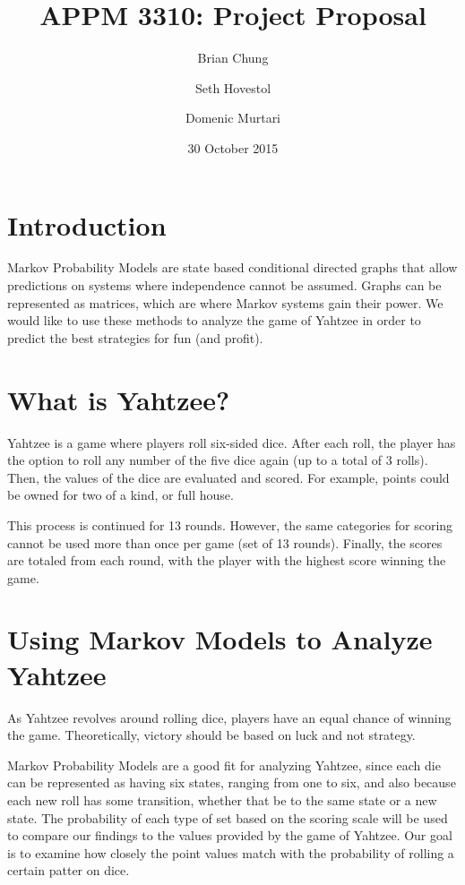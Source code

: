 \documentclass[12pt, letterpaper, twoside]{article}
\title{APPM 3310: Project Proposal}
\author{Brian Chung}
\author{Seth Hovestol}
\author{Domenic Murtari}
\date{30 October 2015}
\begin{document}
\maketitle

\section{Introduction}

Markov Probability Models are state based conditional directed graphs that
allow predictions on systems where independence cannot be assumed. Graphs can
be represented as matrices, which are where Markov systems gain their power.
We would like to use these methods to analyze the game of Yahtzee in order to
predict the best strategies for fun (and profit).

\section{What is Yahtzee?}

Yahtzee is a game where players roll six-sided dice. After each roll, the
player has the option to roll any number of the five dice again (up to a total
of 3 rolls). Then, the values of the dice are evaluated and scored. For example,
points could be owned for two of a kind, or full house.

This process is continued for 13 rounds. However, the same categories for scoring
cannot be used more than once per game (set of 13 rounds). Finally, the scores
are totaled from each round, with the player with the highest score winning the
game.

\section{Using Markov Models to Analyze Yahtzee}

As Yahtzee revolves around rolling dice, players have an equal chance of
winning the game. Theoretically, victory should be based on luck and not
strategy.

Markov Probability Models are a good fit for analyzing Yahtzee, since each
die can be represented as having six states, ranging from one to six, and also
because each new roll has some transition, whether that be to the same state or
a new state. The probability of each type of set based on the scoring scale will
be used to compare our findings to the values provided by the game of Yahtzee.
Our goal is to examine how closely the point values match with the probability
of rolling a certain patter on dice.
\end{document}
